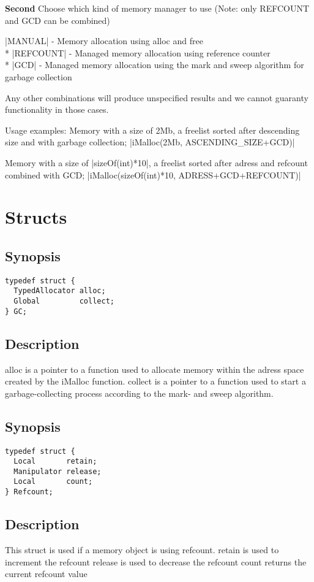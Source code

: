 \documentclass{article}
\begin{document}
{\bf Second} Choose which kind of memory manager to use (Note: only REFCOUNT and GCD can be combined)

|MANUAL| - Memory allocation using alloc and free \\*
|REFCOUNT| - Managed memory allocation using reference counter \\*
|GCD| - Managed memory allocation using the mark and sweep algorithm for garbage collection

Any other combinations will produce unspecified results and we cannot guaranty functionality
in those cases.

Usage examples:
Memory with a size of 2Mb, a freelist sorted after descending size and with garbage collection;
|iMalloc(2Mb, ASCENDING_SIZE+GCD)|

Memory with a size of |sizeOf(int)*10|, a freelist sorted after adress and refcount combined with GCD;
|iMalloc(sizeOf(int)*10, ADRESS+GCD+REFCOUNT)|


\section{Structs}
\subsection*{Synopsis}
\begin{verbatim}
typedef struct {
  TypedAllocator alloc;
  Global         collect;
} GC;
\end{verbatim}
\subsection*{Description}
alloc is a pointer to a function used to allocate memory within the adress space created by the iMalloc function.
collect is a pointer to a function used to start a garbage-collecting process according to the mark- and sweep algorithm.

\subsection*{Synopsis}
\begin{verbatim}
typedef struct {
  Local       retain;
  Manipulator release;
  Local       count;
} Refcount;
\end{verbatim}
\subsection*{Description}
This struct is used if a memory object is using refcount.
retain is used to increment the refcount
release is used to decrease the refcount
count returns the current refcount value
\end{document}
